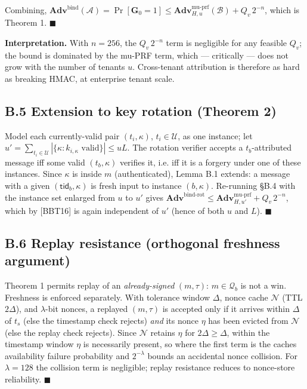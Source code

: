 Combining,
\(\mathbf{Adv}^{\text{bind}}(\mathcal{A})=\Pr[\mathbf{G}_0=1]\le
\mathbf{Adv}^{\text{mu-prf}}_{H,u}(\mathcal{B})+Q_v\,2^{-n}\), which is
Theorem 1. \(\blacksquare\)

\textbf{Interpretation.} With \(n=256\), the \(Q_v\,2^{-n}\) term is
negligible for any feasible \(Q_v\); the bound is dominated by the
mu-PRF term, which --- critically --- does not grow with the number of
tenants \(u\). Cross-tenant attribution is therefore as hard as breaking
HMAC, at enterprise tenant scale.

\subsection{B.5 Extension to key rotation (Theorem
2)}\label{b5-extension-to-key-rotation-theorem-2}

Model each currently-valid pair \((t_i,\kappa)\), \(t_i\in\mathcal{U}\),
as one instance; let
\(u'=\sum_{t_i\in\mathcal{U}}|\{\kappa: k_{i,\kappa}\text{ valid}\}|\le uL\).
The rotation verifier accepts a \(t_b\)-attributed message iff some
valid \((t_b,\kappa)\) verifies it, i.e. iff it is a forgery under one
of these instances. Since \(\kappa\) is inside \(m\) (authenticated),
Lemma B.1 extends: a message with a given \((\mathsf{tid}_b,\kappa)\) is
fresh input to instance \((b,\kappa)\). Re-running §B.4 with the
instance set enlarged from \(u\) to \(u'\) gives
\(\mathbf{Adv}^{\text{bind-rot}}\le\mathbf{Adv}^{\text{mu-prf}}_{H,u'}+Q_v\,2^{-n}\),
which by {[}BBT16{]} is again independent of \(u'\) (hence of both \(u\)
and \(L\)). \(\blacksquare\)

\subsection{B.6 Replay resistance (orthogonal freshness
argument)}\label{b6-replay-resistance-orthogonal-freshness-argument}

Theorem 1 permits replay of an \emph{already-signed} \((m,\tau)\):
\(m\in\mathcal{Q}_b\) is not a win. Freshness is enforced separately.
With tolerance window \(\Delta\), nonce cache \(\mathcal{N}\) (TTL
\(2\Delta\)), and \(\lambda\)-bit nonces, a replayed \((m,\tau)\) is
accepted only if it arrives within \(\Delta\) of \(t_s\) (else the
timestamp check rejects) \emph{and} its nonce \(\eta\) has been evicted
from \(\mathcal{N}\) (else the replay check rejects). Since
\(\mathcal{N}\) retains \(\eta\) for \(2\Delta\ge\Delta\), within the
timestamp window \(\eta\) is necessarily present, so
where the first term is the cache\textquotesingle s availability failure
probability and \(2^{-\lambda}\) bounds an accidental nonce collision.
For \(\lambda=128\) the collision term is negligible; replay resistance
reduces to nonce-store reliability. \(\blacksquare\)

